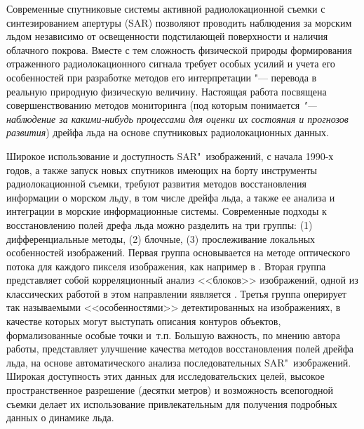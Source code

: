 Современные спутниковые системы активной радиолокационной съемки с синтезированием апертуры (SAR)  \cite{sar} позволяют проводить наблюдения за морским льдом независимо от освещенности подстилающей поверхности и наличия облачного покрова. Вместе с тем сложность физической природы формирования отраженного радиолокационного сигнала требует особых усилий и учета его особенностей при разработке методов его интерпретации "--- перевода в реальную природную физическую величину. Настоящая работа посвящена совершенствованию методов мониторинга (под которым понимается \textit{"--- наблюдение за какими-нибудь процессами для оценки их состояния и прогнозов развития}) дрейфа льда на основе спутниковых радиолокационных данных.

Широкое использование и доступность SAR"~изображений, с начала 1990-х годов, а также запуск новых спутников имеющих на борту инструменты радиолокационной съемки, требуют развития методов восстановления информации о морском льду, в том числе дрейфа льда, а также ее анализа и интеграции в морские информационные системы. Современные подходы к восстановлению полей дрефа льда можно разделить на три группы: (1) дифференциальные методы, (2) блочные, (3) прослеживание локальных особенностей изображений. Первая группа основывается на методе оптического потока для каждого пикселя изображения, как например в \cite{sun1996automatic}. Вторая группа представляет собой корреляционный анализ <<блоков>> изображений, одной из классических работой в этом направлении яявляется \cite{fily1986extracting}. Третья группа оперирует так называемыми <<особенностями>> детектированных на изображениях, в качестве которых могут выступать описания контуров объектов, формализованные особые точки и~т.\:п. \cite{daida1990object,mcconnell1991psi} 
Большую важность, по мнению автора работы, представляет улучшение качества методов восстановления полей дрейфа льда, на основе автоматического анализа последовательных SAR"~изображений. Широкая доступность этих данных для исследовательских целей, высокое пространственное разрешение (десятки метров) и возможность всепогодной съемки делает их использование привлекательным для получения подробных данных о динамике льда.




